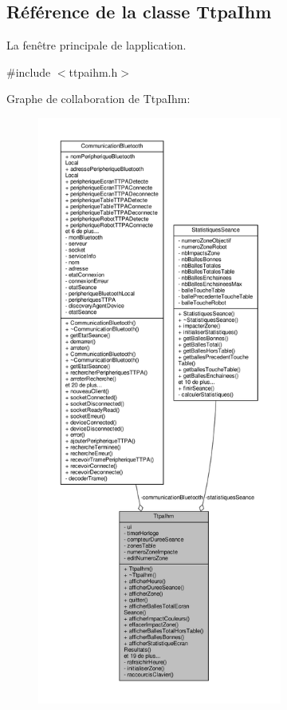 \hypertarget{class_ttpa_ihm}{}\subsection{Référence de la classe Ttpa\+Ihm}
\label{class_ttpa_ihm}


La fenêtre principale de l\textquotesingle{}application.  




{\ttfamily \#include $<$ttpaihm.\+h$>$}



Graphe de collaboration de Ttpa\+Ihm\+:\nopagebreak
\begin{figure}[H]
\begin{center}
\leavevmode
\includegraphics[height=550pt]{class_ttpa_ihm__coll__graph}
\end{center}
\end{figure}
